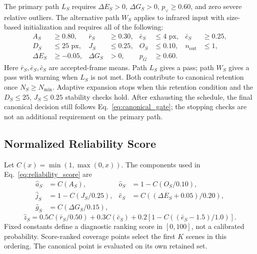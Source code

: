 The primary path $L_S$ requires $\Delta E_S>0$, $\Delta G_S>0$, $p_{\lor}\ge0.60$, and zero
severe relative outliers. The alternative path $W_S$ applies to infrared input with size-based
initialization and requires all of the following:
\begin{equation}
\begin{aligned}
A_S&\ge0.80, & \bar r_S&\ge0.30, & \bar e_S&\le4\text{ px}, & \bar c_S&\ge0.25, \\
D_S&\le25\text{ px}, & J_S&\le0.25, & O_S&\le0.10, & n_{\mathrm{out}}&\le1, \\
\Delta E_S&\ge-0.05, & \Delta G_S&>0, & p_G&\ge0.60. &&
\end{aligned}
\end{equation}
Here $\bar r_S,\bar e_S,\bar c_S$ are accepted-frame means. Path $L_S$ gives a pass;
path $W_S$ gives a pass with warning when $L_S$ is not met. Both contribute to canonical retention
once $N_S\ge N_{\min}$. Adaptive expansion stops when this retention condition and the
$D_S\le25$, $J_S\le0.25$ stability checks hold. After exhausting the schedule, the final
canonical decision still follows Eq.~\ref{eq:canonical_gate}; the stopping checks are not an
additional requirement on the primary path.

\subsection{Normalized Reliability Score}
\label{sec:score_normalization}

Let $C(x)=\min(1,\max(0,x))$. The components used in Eq.~\ref{eq:reliability_score} are
\begin{equation}
\begin{aligned}
\hat a_S &= C(A_S), & \hat o_S &= 1-C(O_S/0.10), \\
\hat j_S &= 1-C(J_S/0.25), & \hat e_S &= C((\Delta E_S+0.05)/0.20), \\
\hat g_S &= C(\Delta G_S/0.15), &&
\end{aligned}
\end{equation}
\begin{equation}
\hat z_S=0.5C(\bar r_S/0.50)+0.3C(\bar c_S)
       +0.2\left[1-C\!\left((\bar e_S-1.5)/1.0\right)\right].
\end{equation}
Fixed constants define a diagnostic ranking score in $[0,100]$, not a calibrated probability.
Score-ranked coverage points select
the first $K$ scenes in this ordering. The canonical point is evaluated on its own retained set.

